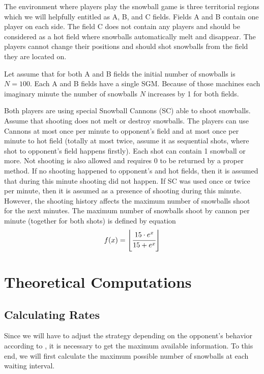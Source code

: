 \documentclass[conference]{IEEEtran}
\begin{document}

The environment where players play the snowball game is three territorial regions which we will helpfully entitled as A, B, and C fields. Fields A and B contain one player on each side. The field C does not contain any players and should be considered as a hot field where snowballs automatically melt and disappear. The players cannot change their positions and should shot snowballs from the field they are located on. 

Let assume that for both A and B fields the initial number of snowballs is $N=100$. Each A and B fields have a single SGM. Because of those machines each imaginary minute the number of snowballs $N$ increases by 1 for both fields.

Both players are using special Snowball Cannons (SC) able to shoot snowballs. Assume that shooting does not melt or destroy snowballs. The players can use Cannons at most once per minute to opponent’s field and at most once per minute to hot field (totally at most twice, assume it as sequential shots, where shot to opponent’s field happens firstly). Each shot can contain 1 snowball or more. Not shooting is also allowed and requires 0 to be returned by a proper method. If no shooting happened to opponent’s and hot fields, then it is assumed that during this minute shooting did not happen. If SC was used once or twice per minute, then it is assumed as a presence of shooting during this minute. However, the shooting history affects the maximum number of snowballs shoot for the next minutes. The maximum number of snowballs shoot by cannon per minute (together for both shots) is defined by equation
\begin{equation}
f(x) = \left \lfloor \cfrac{15 \cdot e^x}{15 + e^x} \right \rfloor\label{eq1}
\end{equation}

\section{Theoretical Computations}
\subsection{Calculating Rates}
Since we will have to adjust the strategy depending on the opponent's behavior according to \cite{b2}, it is necessary to get the maximum available information. To this end, we will first calculate the maximum possible number of snowballs at each waiting interval.
\end{document}
